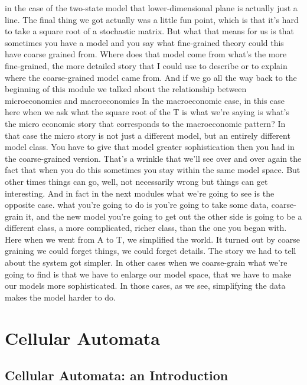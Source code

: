 \documentclass[]{article}
\begin{document}
in the case of the two-state model that
lower-dimensional plane is actually just a line.
The final thing we got
actually was a little fun point,
which is that it's hard to take
a square root of a stochastic matrix.
But what that means for us is that
sometimes you have a model
and you say what fine-grained theory
could this have coarse grained from.
Where does that model come from
what's the more fine-grained,
the more detailed story
that I could use to describe or to explain
where the coarse-grained model came from.
And if we go all the way back
to the beginning of this module
we talked about the relationship between
microeconomics and macroeconomics
In the macroeconomic case,
in this case here when we ask what
the square root of the T is what we're saying is
what's the micro economic story that
corresponds to the macroeconomic pattern?
In that case the micro story is
not just a different model,
but an entirely different model class.
You have to give that model
greater sophistication
then you had in the coarse-grained
version.
That's a wrinkle that we'll see
over and over again
the fact that when you do this sometimes
you stay within the same model space.
But other times things can go, well,
not necessarily wrong
but things can get interesting.
And in fact in the next modules
what we're going to see is
the opposite case.
what you're going to do is you're
going to take some data,
coarse-grain it,
and the new model you're going
to get out the other side
is going to be a different class,
a more complicated, richer class,
than the one you began with.
Here when we went from A to T, we simplified the world.
It turned out by coarse graining
we could forget things,
we could forget details.
The story we had to tell about the system
got simpler.
In other cases when we coarse-grain
what we're going to find is that
we have to enlarge our model space,
that we have to make our models
more sophisticated.
In those cases, as we see,
simplifying the data makes
the model harder to do.

\cite{dedeo2016conflict}

\section{Cellular Automata}

\subsection{Cellular Automata: an Introduction}
\end{document}
